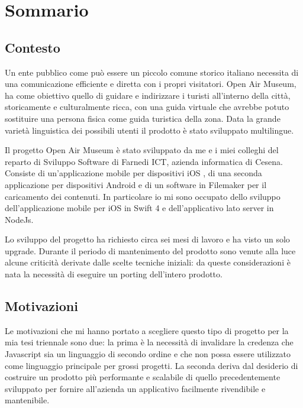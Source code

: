 \chapter*{Sommario} %
\label{sommario}

\vspace{5mm}

\section*{Contesto}\vspace{5mm}

Un ente pubblico come può essere un piccolo comune storico italiano necessita di una comunicazione efficiente e diretta con i propri visitatori. Open Air Museum, ha come obiettivo quello di guidare e indirizzare i turisti all’interno della città, storicamente e culturalmente ricca, con una guida virtuale che avrebbe potuto sostituire una persona fisica come guida turistica della zona. Data la grande varietà linguistica dei possibili utenti il prodotto è stato sviluppato multilingue.\vspace{5mm}

Il progetto Open Air Museum è stato sviluppato da me e i miei colleghi del reparto di Sviluppo Software di Farnedi ICT\cite{FICT}, azienda informatica di Cesena. Consiste di un’applicazione mobile per dispositivi iOS\cite{IOS} , di una seconda applicazione per dispositivi Android\cite{ANDROID} e di un software in Filemaker\cite{FileMaker} per il caricamento dei contenuti. In particolare io mi sono occupato dello sviluppo dell’applicazione mobile per iOS\cite{IOS} in Swift 4\cite{Swift} e dell’applicativo lato server in NodeJs\cite{Nodejs}.\vspace{5mm}

Lo sviluppo del progetto ha richiesto circa sei mesi di lavoro e ha visto un solo upgrade. Durante il periodo di mantenimento del prodotto sono venute alla luce alcune criticità derivate dalle scelte tecniche iniziali: da queste considerazioni è nata la necessità di eseguire un porting dell'intero prodotto. 

\section*{Motivazioni}\vspace{5mm}

Le motivazioni che mi hanno portato a scegliere questo tipo di progetto per la mia tesi triennale sono due: la prima è la necessità di invalidare la credenza che Javascript\cite{JS} sia un linguaggio di secondo ordine e che non possa essere utilizzato come linguaggio principale per grossi progetti. La seconda deriva dal desiderio di costruire un prodotto più performante e scalabile di quello precedentemente sviluppato per fornire all'azienda un applicativo facilmente rivendibile e mantenibile. 

